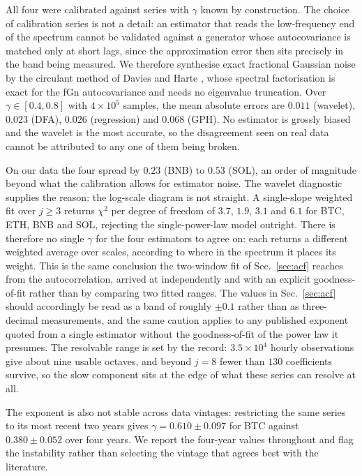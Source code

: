 \documentclass[aps,pre,twocolumn,superscriptaddress,floatfix,nofootinbib]{revtex4-2}
\begin{document}
All four were calibrated against series with $\gamma$ known by construction. The
choice of calibration series is not a detail: an estimator that reads the
low-frequency end of the spectrum cannot be validated against a generator whose
autocovariance is matched only at short lags, since the approximation error then
sits precisely in the band being measured. We therefore synthesise exact
fractional Gaussian noise by the circulant method of Davies and Harte
\cite{davies1987}, whose spectral factorisation is exact for the fGn
autocovariance and needs no eigenvalue truncation. Over $\gamma\in[0.4,0.8]$
with $4\times10^5$ samples, the mean absolute errors are $0.011$ (wavelet),
$0.023$ (DFA), $0.026$ (regression) and $0.068$ (GPH). No estimator is grossly
biased and the wavelet is the most accurate, so the disagreement seen on real
data cannot be attributed to any one of them being broken.

On our data the four spread by $0.23$ (BNB) to $0.53$ (SOL), an order of
magnitude beyond what the calibration allows for estimator noise. The wavelet
diagnostic supplies the reason: the log-scale diagram is not straight. A
single-slope weighted fit over $j\ge3$ returns $\chi^2$ per degree of freedom of
$3.7$, $1.9$, $3.1$ and $6.1$ for BTC, ETH, BNB and SOL, rejecting the
single-power-law model outright. There is therefore no single $\gamma$ for the
four estimators to agree on: each returns a different weighted average over
scales, according to where in the spectrum it places its weight. This is the
same conclusion the two-window fit of Sec.~\ref{sec:acf} reaches from the
autocorrelation, arrived at independently and with an explicit goodness-of-fit
rather than by comparing two fitted ranges. The values in Sec.~\ref{sec:acf}
should accordingly be read as a band of roughly $\pm0.1$ rather than as
three-decimal measurements, and the same caution applies to any published
exponent quoted from a single estimator without the goodness-of-fit of the power
law it presumes. The resolvable range is set by the record: $3.5\times10^4$
hourly observations give about nine usable octaves, and beyond $j=8$ fewer than
$130$ coefficients survive, so the slow component sits at the edge of what these
series can resolve at all.

The exponent is also not stable across data vintages: restricting the same
series to its most recent two years gives $\gamma=0.610\pm0.097$ for BTC
against $0.380\pm0.052$ over four years. We report the four-year values
throughout and flag the instability rather than selecting the vintage that
agrees best with the literature.
\end{document}
